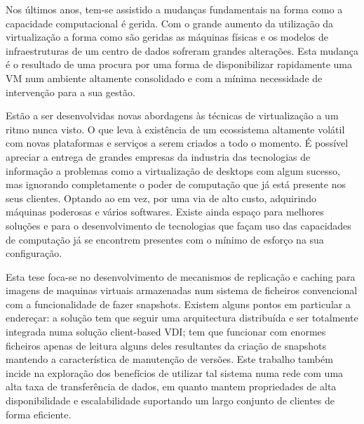 
Nos últimos anos, tem-se assistido a mudanças fundamentais na forma como a capacidade computacional é gerida. Com o grande aumento da utilização da virtualização a forma como são geridas as máquinas físicas e os modelos de infraestruturas de um centro de dados sofreram grandes alterações. Esta mudança é o resultado de uma procura por uma forma de disponibilizar rapidamente uma VM num ambiente altamente consolidado e com a mínima necessidade de intervenção para a sua gestão.

Estão a ser desenvolvidas novas abordagens às técnicas de virtualização a um ritmo nunca visto. O que leva à existência de um ecossistema altamente volátil com novas plataformas e serviços a serem criados a todo o momento. É possível apreciar a entrega de grandes empresas da industria das tecnologias de informação a problemas como a virtualização de desktops com algum sucesso, mas ignorando completamente o poder de computação que já está presente nos seus clientes. Optando ao em vez, por uma via de alto custo, adquirindo máquinas poderosas e vários softwares. Existe ainda espaço para melhores soluções e para o desenvolvimento de tecnologias que façam uso das capacidades de computação já se encontrem presentes com o mínimo de esforço na sua configuração.

Esta tese foca-se no desenvolvimento de mecanismos de replicação e caching para imagens de maquinas virtuais armazenadas num sistema de ficheiros convencional com a funcionalidade de fazer snapshots. Existem alguns pontos em particular a endereçar: a solução tem que seguir uma arquitectura distribuída e ser totalmente integrada numa solução client-based VDI; tem que funcionar com enormes ficheiros apenas de leitura alguns deles resultantes da criação de snapshots mantendo a característica de manutenção de versões. Este trabalho também incide na exploração dos benefícios de utilizar tal sistema numa rede com uma alta taxa de transferência de dados, em quanto mantem propriedades de alta disponibilidade e escalabilidade suportando um largo conjunto de clientes de forma eficiente.


